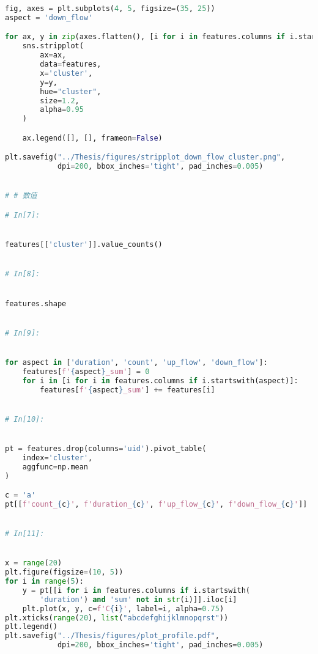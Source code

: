 \documentclass[withoutpreface,bwprint]{cumcmthesis}
\begin{document}
\begin{appendices}
\begin{lstlisting}[language=Python]
fig, axes = plt.subplots(4, 5, figsize=(35, 25))
aspect = 'down_flow'

for ax, y in zip(axes.flatten(), [i for i in features.columns if i.startswith(aspect)]):
    sns.stripplot(
        ax=ax,
        data=features,
        x='cluster',
        y=y,
        hue="cluster",
        size=1.2,
        alpha=0.95
    )

    ax.legend([], [], frameon=False)

plt.savefig("../Thesis/figures/stripplot_down_flow_cluster.png",
            dpi=200, bbox_inches='tight', pad_inches=0.005)


# # 数值

# In[7]:


features[['cluster']].value_counts()


# In[8]:


features.shape


# In[9]:


for aspect in ['duration', 'count', 'up_flow', 'down_flow']:
    features[f'{aspect}_sum'] = 0
    for i in [i for i in features.columns if i.startswith(aspect)]:
        features[f'{aspect}_sum'] += features[i]


# In[10]:


pt = features.drop(columns='uid').pivot_table(
    index='cluster',
    aggfunc=np.mean
)

c = 'a'
pt[[f'count_{c}', f'duration_{c}', f'up_flow_{c}', f'down_flow_{c}']]


# In[11]:


x = range(20)
plt.figure(figsize=(10, 5))
for i in range(5):
    y = pt[[i for i in features.columns if i.startswith(
        'duration') and 'sum' not in str(i)]].iloc[i]
    plt.plot(x, y, c=f'C{i}', label=i, alpha=0.75)
plt.xticks(range(20), list("abcdefghijklmnopqrst"))
plt.legend()
plt.savefig("../Thesis/figures/plot_profile.pdf",
            dpi=200, bbox_inches='tight', pad_inches=0.005)
    \end{lstlisting}

\end{appendices}
\end{document}
